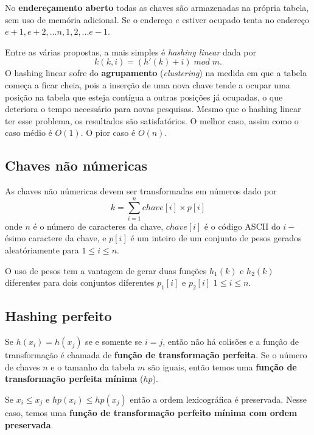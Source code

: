 No {\bf endereçamento aberto} todas as chaves são armazenadas na própria 
tabela, sem uso de memória adicional.
Se o endereço $e$ estiver ocupado tenta no endereço $e+1, e+2, ... n, 1, 2, ...  e-1$.

Entre as várias propostas, a mais simples é \emph{hashing linear} dada por
\begin{equation*}
k(k,i) = (h'(k) + i)\; mod \; m.
\end{equation*}
O hashing linear sofre do {\bf agrupamento} (\emph{clustering}) na medida
em que a tabela começa a ficar cheia, pois a inserção de uma nova chave tende
a ocupar uma posição na tabela que esteja contígua a outras posições já ocupadas,
o que deteriora o tempo necessário para novas pesquisas.
Mesmo que o hashing linear ter esse problema, os resultados são satisfatórios.
O melhor caso, assim como o caso médio é $O(1)$.
O pior caso é $O(n)$.

\subsection{Chaves não númericas}

As chaves não númericas devem ser transformadas em números dado por
\begin{equation*}
k = \sum_{i = 1}^{n} chave[i] \times p[i]
\end{equation*}
onde $n$ é o número de caracteres da chave, $chave[i]$ é o código ASCII do $i-$ésimo
caractere da chave, e $p[i]$ é um inteiro de um conjunto de pesos gerados aleatóriamente
para $1 \leq i \leq n$.

O uso de pesos tem a vantagem de gerar duas funções $h_1(k)$ e $h_2(k)$ diferentes
para dois conjuntos diferentes $p_1[i]$ e $p_2[i]$ $1 \leq i \leq n$.

\subsection{Hashing perfeito}

Se $h(x_i) = h(x_j)$ se e somente se $i = j$, então não há colisões e a 
função de transformação é chamada de {\bf função de transformação perfeita}.
Se o número de chaves $n$ e o tamanho da tabela $m$ são iguais, então temos uma
{\bf função de transformação perfeita mínima} ($hp$).

Se $x_i \leq x_j$ e $hp(x_i) \leq hp(x_j)$ então a ordem lexicográfica é preservada. 
Nesse caso, temos uma {\bf função de transformação perfeito mínima com ordem preservada}.

